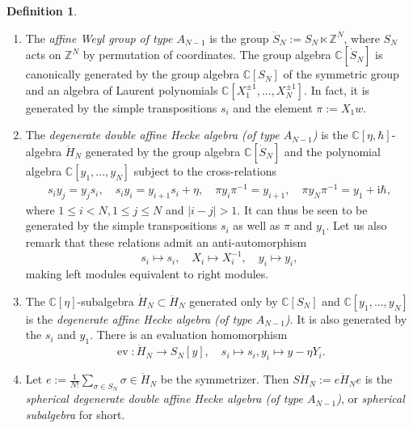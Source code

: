 \documentclass[11pt]{report}
\theoremstyle{definition}
\newtheorem{definition}[theorem]{Definition}
\theoremstyle{remark}
\theoremstyle{remark}
\newcommand{\Z}{\mathbb{Z}}
\newcommand{\C}{\mathbb{C}}
\newcommand{\I}{\mathrm{i}}
\begin{document}
\begin{definition}
\begin{enumerate}[label=(\roman*)]
\item The \emph{affine Weyl group of type $A_{N-1}$} is the group $\dot S_N := S_N \ltimes \Z^N$, where $S_N$ acts on $\Z^N$ by permutation of coordinates. The group algebra $\C[\dot S_N]$ is canonically generated by the group algebra $\C[S_N]$ of the symmetric group and an algebra of Laurent polynomials $\C[X_1^{\pm 1},...,X_N^{\pm 1}]$. In fact, it is generated by the simple transpositions $s_i$ and the element $\pi := X_1 w$.
\item The \emph{degenerate double affine Hecke algebra (of type $A_{N-1}$)} is the $\C[\eta,\hbar]$-algebra $\ddot H_N$ generated by the group algebra $\C[\dot S_N]$ and the polynomial algebra $\C[y_1,...,y_N]$ subject to the cross-relations
\begin{align*}
s_i y_j = y_j s_i, \quad s_i y_i = y_{i+1} s_i + \eta, \quad \pi y_i \pi^{-1} = y_{i+1}, \quad \pi y_N \pi^{-1} = y_1 + \I \hbar,
\end{align*}
where $1 \leq i < N, 1 \leq j \leq N$ and $|i-j|>1$. It can thus be seen to be generated by the simple transpositions $s_i$ as well as $\pi$ and $y_1$. Let us also remark that these relations admit an anti-automorphism
\begin{equation*}
s_i \mapsto s_i, \quad X_i \mapsto X_i^{-1}, \quad y_i \mapsto y_i,
\end{equation*}
making left modules equivalent to right modules.
\item The $\C[\eta]$-subalgebra $\dot H_N \subset \ddot H_N$ generated only by $\C[S_N]$ and $\C[y_1,...,y_N]$ is the \emph{degenerate affine Hecke algebra (of type $A_{N-1}$)}. It is also generated by the $s_i$ and $y_1$. There is an evaluation homomorphism
\begin{equation*}
\operatorname{ev}: \dot H_N \to S_N[y], \quad s_i \mapsto s_i, y_i \mapsto y - \eta Y_i.
\end{equation*}
\item Let $e := \frac{1}{N!}\sum_{\sigma \in S_N} \sigma \in \ddot H_N$ be the symmetrizer. Then $S\ddot H_N := e \ddot H_N e$ is the \emph{spherical degenerate double affine Hecke algebra (of type $A_{N-1}$)}, or \emph{spherical subalgebra} for short.
\end{enumerate}
\end{definition}
\end{document}
